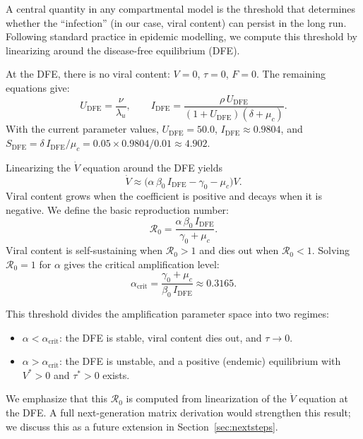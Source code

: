 \documentclass[11pt]{article}
\begin{document}
A central quantity in any compartmental model is the threshold that determines whether the ``infection'' (in our case, viral content) can persist in the long run. Following standard practice in epidemic modelling, we compute this threshold by linearizing around the disease-free equilibrium (DFE).

At the DFE, there is no viral content: $V = 0$, $\tau = 0$, $F = 0$. The remaining equations give:
\begin{equation}
U_{\mathrm{DFE}} = \frac{\nu}{\lambda_u}, \qquad
I_{\mathrm{DFE}} = \frac{\rho\, U_{\mathrm{DFE}}}{(1 + U_{\mathrm{DFE}})(\delta + \mu_c)}.
\label{eq:dfe}
\end{equation}
With the current parameter values, $U_{\mathrm{DFE}} = 50.0$, $I_{\mathrm{DFE}} \approx 0.9804$, and $S_{\mathrm{DFE}} = \delta\, I_{\mathrm{DFE}} / \mu_c = 0.05 \times 0.9804 / 0.01 \approx 4.902$.

Linearizing the $\dot{V}$ equation around the DFE yields
\[
\dot{V} \approx \bigl(\alpha\,\beta_0\,I_{\mathrm{DFE}} - \gamma_0 - \mu_c\bigr) V.
\]
Viral content grows when the coefficient is positive and decays when it is negative. We define the basic reproduction number:
\begin{equation}
\boxed{\mathcal{R}_0 = \frac{\alpha\,\beta_0\,I_{\mathrm{DFE}}}{\gamma_0 + \mu_c}.}
\label{eq:R0}
\end{equation}
Viral content is self-sustaining when $\mathcal{R}_0 > 1$ and dies out when $\mathcal{R}_0 < 1$. Solving $\mathcal{R}_0 = 1$ for $\alpha$ gives the critical amplification level:
\begin{equation}
\alpha_{\mathrm{crit}} = \frac{\gamma_0 + \mu_c}{\beta_0\,I_{\mathrm{DFE}}} \approx 0.3165.
\label{eq:alpha_crit}
\end{equation}

This threshold divides the amplification parameter space into two regimes:
\begin{itemize}[leftmargin=1.5em]
    \item $\alpha < \alpha_{\mathrm{crit}}$: the DFE is stable, viral content dies out, and $\tau \to 0$.
    \item $\alpha > \alpha_{\mathrm{crit}}$: the DFE is unstable, and a positive (endemic) equilibrium with $V^* > 0$ and $\tau^* > 0$ exists.
\end{itemize}

We emphasize that this $\mathcal{R}_0$ is computed from linearization of the $\dot{V}$ equation at the DFE. A full next-generation matrix derivation would strengthen this result; we discuss this as a future extension in Section~\ref{sec:nextsteps}.
\end{document}
